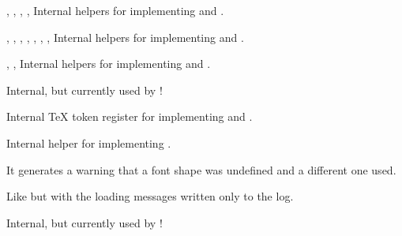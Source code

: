 \documentclass{l3in2edoc}
\begin{document}
\begin{function}[int]
  {
    \merge@font@shape,
    \merge@font@shape@,
    \merge@font@shape@without@substitution,
    \merge@font@shape@without@substitution@,
    \delayed@merge@font@shape
  }
%
  Internal helpers for implementing  and
  .
\end{function}




\begin{function}[int]
  {
    \merge@font@series,
    \merge@font@series@,
    \merge@font@series@without@substitution,
    \merge@font@series@without@substitution@,
    \delayed@merge@font@series,
    \set@target@series,
    \series@maybe@drop@one@m@x,
    \series@drop@one@m
  }
%
  Internal helpers for implementing  and
  .
\end{function}



\begin{function}[int]
  {
    \if@forced@series,
    \@forced@seriesfalse,
    \@forced@seriestrue
  }
  Internal helpers for implementing  and
  .

  Internal, but currently used by !
\end{function}


\begin{function}[int]
  {
    \series@check@toks
  }
%
  Internal \TeX{} token register for implementing  and
  .
\end{function}





\begin{function}[int]
  {
    \@font@shape@subst@warning
  }
  Internal helper for implementing .

  It generates a warning that a font shape was undefined and a
  different one used.
\end{function}



\begin{function}[int]
  {
    \maybe@load@fontshape
  }
%
  Like  but with the loading messages written
  only to the log.

  Internal, but currently used by !
\end{function}
\end{document}
